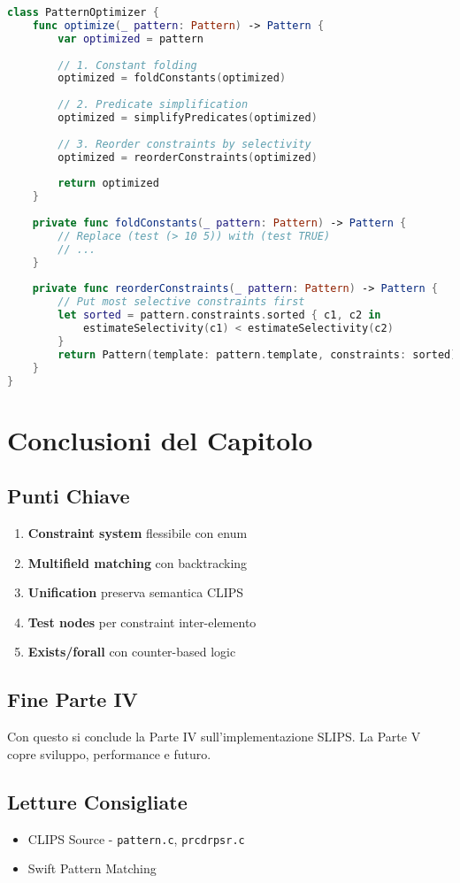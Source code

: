 \begin{lstlisting}[language=Swift]
class PatternOptimizer {
    func optimize(_ pattern: Pattern) -> Pattern {
        var optimized = pattern
        
        // 1. Constant folding
        optimized = foldConstants(optimized)
        
        // 2. Predicate simplification
        optimized = simplifyPredicates(optimized)
        
        // 3. Reorder constraints by selectivity
        optimized = reorderConstraints(optimized)
        
        return optimized
    }
    
    private func foldConstants(_ pattern: Pattern) -> Pattern {
        // Replace (test (> 10 5)) with (test TRUE)
        // ...
    }
    
    private func reorderConstraints(_ pattern: Pattern) -> Pattern {
        // Put most selective constraints first
        let sorted = pattern.constraints.sorted { c1, c2 in
            estimateSelectivity(c1) < estimateSelectivity(c2)
        }
        return Pattern(template: pattern.template, constraints: sorted)
    }
}
\end{lstlisting}

\section{Conclusioni del Capitolo}

\subsection{Punti Chiave}

\begin{enumerate}
\item \textbf{Constraint system} flessibile con enum
\item \textbf{Multifield matching} con backtracking
\item \textbf{Unification} preserva semantica CLIPS
\item \textbf{Test nodes} per constraint inter-elemento
\item \textbf{Exists/forall} con counter-based logic
\end{enumerate}

\subsection{Fine Parte IV}

Con questo si conclude la Parte IV sull'implementazione SLIPS. La Parte V copre sviluppo, performance e futuro.

\subsection{Letture Consigliate}

\begin{itemize}
\item CLIPS Source - \texttt{pattern.c}, \texttt{prcdrpsr.c}
\item Swift Pattern Matching
\end{itemize}
